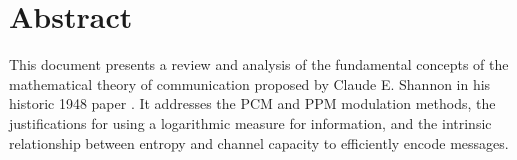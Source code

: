 \chapter*{Abstract}

This document presents a review and analysis of the fundamental concepts of the mathematical theory of communication proposed by Claude E. Shannon in his historic 1948 paper \parencite{shannon1948mathematical}. It addresses the PCM and PPM modulation methods, the justifications for using a logarithmic measure for information, and the intrinsic relationship between entropy and channel capacity to efficiently encode messages.
